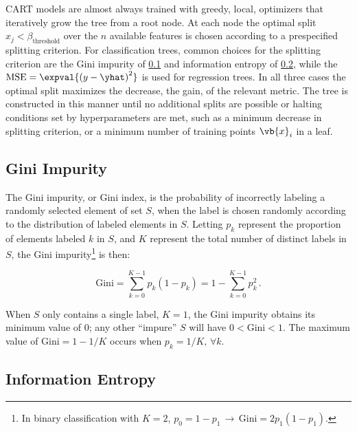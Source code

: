 CART models are almost always trained with greedy, \ie local, optimizers
that iteratively grow the tree from a root node.
At each node the optimal split $x_{j} < \beta_{\text{threshold}}$
over the $n$ available features is chosen according to a prespecified splitting criterion.
For classification trees, common choices for the splitting criterion are
the Gini impurity of \cref{class:CART:gini_impurity}
and information entropy of \cref{class:CART:info_entropy},
while the $\text{MSE} = \expval{\left(y-\yhat\right)^{2}}$ is used for regression trees.
In all three cases the optimal split maximizes the decrease, \ie the gain, of the relevant metric.
The tree is constructed in this manner until no additional splits are possible or
halting conditions set by hyperparameters are met, such as
a minimum decrease in splitting criterion,
or a minimum number of training points $\vb{x}_{i}$ in a leaf.

\subsection{Gini Impurity}
\label{class:CART:gini_impurity}

The Gini impurity, or Gini index,
is the probability of incorrectly labeling a randomly selected element of set $S$,
when the label is chosen randomly according to the distribution of labeled elements in $S$.
Letting $p_{k}$ represent the proportion of elements labeled $k$ in $S$,
and $K$ represent the total number of distinct labels in $S$,
the Gini impurity\footnote{In binary classification with $K=2$,
$p_{0} = 1 - p_{1} \, \to \, \text{Gini} = 2 p_{1} \left(1-p_{1}\right)$.} is then:

\begin{equation} \label{eq:gini_impurity}
\text{Gini} = \sum_{k=0}^{K-1} p_{k}\left(1-p_{k}\right) = 1 - \sum_{k=0}^{K-1} p_{k}^{2}\,.
\end{equation}

When $S$ only contains a single label, $K=1$,
the Gini impurity obtains its minimum value of $0$;
any other ``impure'' $S$ will have $0 < \text{Gini} < 1$.
The maximum value of $\text{Gini} = 1-1/K$ occurs when $p_{k} = 1/K, \, \forall k$.

\subsection{Information Entropy}
\label{class:CART:info_entropy}

